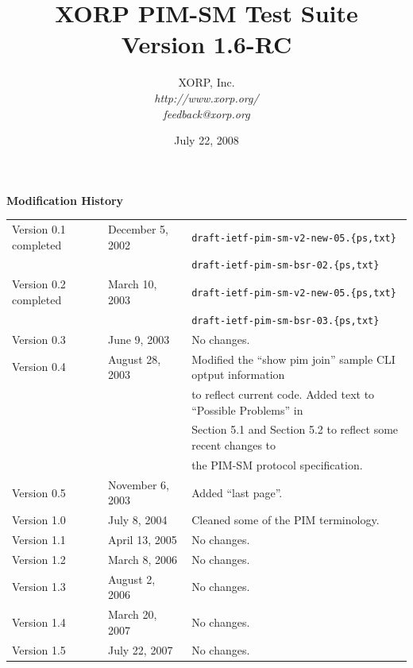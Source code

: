 \documentclass[11pt]{report}
\begin{document}
\title{XORP PIM-SM Test Suite \\
\vspace{1ex}
Version 1.6-RC}
\author{ XORP, Inc.					\\
         {\it http://www.xorp.org/}			\\
	 {\it feedback@xorp.org}
}
\date{July 22, 2008}

\maketitle


\newpage

{\huge \bf Modification History}
\vspace{4ex}

\begin{tabular}{lll}
Version 0.1 completed	& December 5, 2002 & \verb=draft-ietf-pim-sm-v2-new-05.{ps,txt}= \\
			&		   & \verb=draft-ietf-pim-sm-bsr-02.{ps,txt}= \\
Version 0.2 completed	& March 10, 2003 & \verb=draft-ietf-pim-sm-v2-new-05.{ps,txt}= \\
			&		   & \verb=draft-ietf-pim-sm-bsr-03.{ps,txt}= \\
Version 0.3		& June 9, 2003	   & No changes. \\
Version 0.4		& August 28, 2003  & Modified the ``show pim join''
			sample CLI optput information \\
			&		   & to reflect current code. Added
			text to ``Possible Problems'' in \\
			&		   & Section 5.1 and Section 5.2 to
			reflect some recent changes to \\
			&		   & the PIM-SM protocol
			specification. \\
Version 0.5		& November 6, 2003 & Added ``last page''. \\
Version 1.0		& July 8, 2004 & Cleaned some of the PIM
			terminology. \\
Version 1.1		& April 13, 2005	& No changes. \\
Version 1.2		& March 8, 2006		& No changes. \\
Version 1.3		& August 2, 2006	& No changes. \\
Version 1.4		& March 20, 2007	& No changes. \\
Version 1.5		& July 22, 2007		& No changes. \\
\end{tabular}
\end{document}
